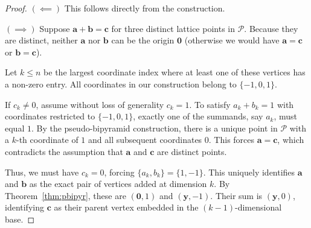 \documentclass[a4paper,11pt,reqno]{amsart}
\begin{document}
\begin{proof} 

\noindent $(\impliedby)$ This follows directly from the construction.
		
\noindent $(\implies)$ Suppose $\bm{a} + \bm{b} = \bm{c}$ for three distinct lattice points in $\mathcal{P}$. Because they are distinct, 
neither $\bm{a}$ nor $\bm{b}$ can be the origin $\bm{0}$ (otherwise we would have $\bm{a} = \bm{c}$ or $\bm{b} = \bm{c}$).

Let $k \le n$ be the largest coordinate index where at least one of these vertices has a non-zero entry. All coordinates in our 
construction belong to $\{-1, 0, 1\}$.
		
If $c_k \neq 0$, assume without loss of generality $c_k = 1$. To satisfy $a_k + b_k = 1$ with coordinates restricted to $\{-1, 0, 1\}$, 
exactly one of the summands, say $a_k$, must equal $1$. By the pseudo-bipyramid construction, there is a unique point in 
$\mathcal{P}$ with a $k$-th coordinate of $1$ and all subsequent coordinates $0$. This forces $\bm{a} = \bm{c}$, which contradicts 
the assumption that $\bm{a}$ and $\bm{c}$ are distinct points.
		
Thus, we must have $c_k = 0$, forcing $\{a_k, b_k\} = \{1, -1\}$. This uniquely identifies $\bm{a}$ and $\bm{b}$ as the exact pair of 
vertices added at dimension $k$. By Theorem~\ref{thm:pbipyr}, these are $(\bm{0}, 1)$ and $(\bm{y}, -1)$. Their sum is $(\bm{y}, 0)$, 
identifying $\bm{c}$ as their parent vertex embedded in the $(k-1)$-dimensional base.
\end{proof}
\end{document}
